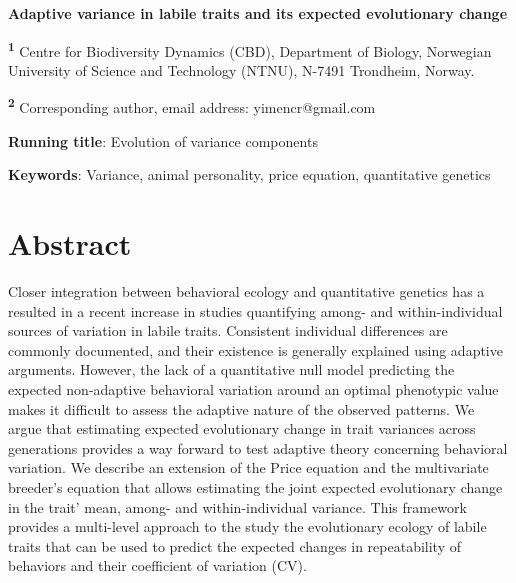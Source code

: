 \documentclass{article}
\begin{document}
\begin{center}
\large
\textbf{Adaptive variance in labile traits and its expected evolutionary change }
\end{center}


\bigskip

\noindent \textsuperscript{\textbf{1}} Centre for Biodiversity Dynamics (CBD), Department of Biology, Norwegian University of Science and Technology (NTNU), N-7491 Trondheim, Norway.

\noindent \textsuperscript{\textbf{2}} Corresponding author, email address: yimencr@gmail.com


\bigskip
\noindent \textbf{Running title}:  Evolution of variance components


\bigskip
\noindent \textbf{Keywords}: Variance, animal personality, price equation, quantitative genetics


\newpage
\section{Abstract}
Closer integration between behavioral ecology and quantitative genetics has a resulted in a recent increase in studies quantifying among- and within-individual sources of variation in labile traits. Consistent individual differences are commonly documented, and their existence is generally explained using adaptive arguments. However, the lack of a quantitative null model predicting the expected non-adaptive behavioral variation around an optimal phenotypic value makes it difficult to assess the adaptive nature of the observed patterns. We argue that estimating expected evolutionary change in trait variances across generations provides a way forward to test adaptive theory concerning behavioral variation. We describe an extension of the Price equation and the multivariate breeder’s equation that allows estimating the joint expected evolutionary change in the trait' mean, among- and within-individual variance. This framework provides a multi-level approach to the study the evolutionary ecology of labile traits that can be used to predict the expected changes in repeatability of behaviors and their coefficient of variation (CV). 


\newpage
\end{document}
